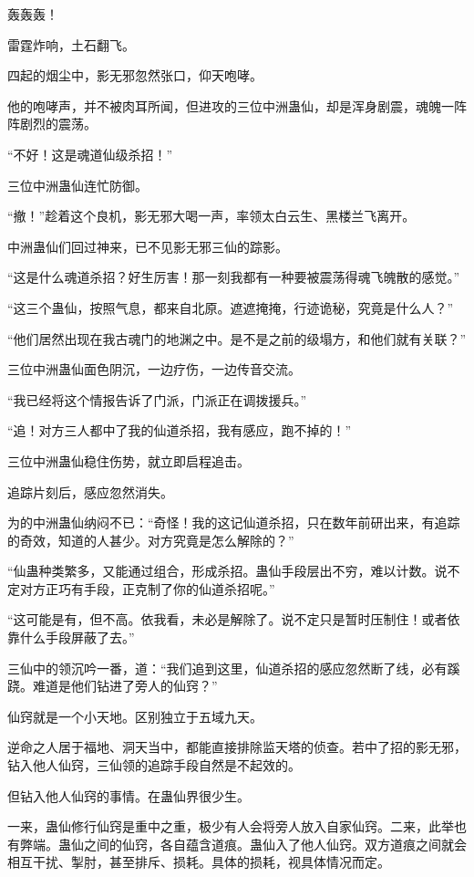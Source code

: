 
\begin{this_body}

轰轰轰！

雷霆炸响，土石翻飞。

四起的烟尘中，影无邪忽然张口，仰天咆哮。

他的咆哮声，并不被肉耳所闻，但进攻的三位中洲蛊仙，却是浑身剧震，魂魄一阵阵剧烈的震荡。

“不好！这是魂道仙级杀招！”

三位中洲蛊仙连忙防御。

“撤！”趁着这个良机，影无邪大喝一声，率领太白云生、黑楼兰飞离开。

中洲蛊仙们回过神来，已不见影无邪三仙的踪影。

“这是什么魂道杀招？好生厉害！那一刻我都有一种要被震荡得魂飞魄散的感觉。”

“这三个蛊仙，按照气息，都来自北原。遮遮掩掩，行迹诡秘，究竟是什么人？”

“他们居然出现在我古魂门的地渊之中。是不是之前的级塌方，和他们就有关联？”

三位中洲蛊仙面色阴沉，一边疗伤，一边传音交流。

“我已经将这个情报告诉了门派，门派正在调拨援兵。”

“追！对方三人都中了我的仙道杀招，我有感应，跑不掉的！”

三位中洲蛊仙稳住伤势，就立即启程追击。

追踪片刻后，感应忽然消失。

为的中洲蛊仙纳闷不已：“奇怪！我的这记仙道杀招，只在数年前研出来，有追踪的奇效，知道的人甚少。对方究竟是怎么解除的？”

“仙蛊种类繁多，又能通过组合，形成杀招。蛊仙手段层出不穷，难以计数。说不定对方正巧有手段，正克制了你的仙道杀招呢。”

“这可能是有，但不高。依我看，未必是解除了。说不定只是暂时压制住！或者依靠什么手段屏蔽了去。”

三仙中的领沉吟一番，道：“我们追到这里，仙道杀招的感应忽然断了线，必有蹊跷。难道是他们钻进了旁人的仙窍？”

仙窍就是一个小天地。区别独立于五域九天。

逆命之人居于福地、洞天当中，都能直接排除监天塔的侦查。若中了招的影无邪，钻入他人仙窍，三仙领的追踪手段自然是不起效的。

但钻入他人仙窍的事情。在蛊仙界很少生。

一来，蛊仙修行仙窍是重中之重，极少有人会将旁人放入自家仙窍。二来，此举也有弊端。蛊仙之间的仙窍，各自蕴含道痕。蛊仙入了他人仙窍。双方道痕之间就会相互干扰、掣肘，甚至排斥、损耗。具体的损耗，视具体情况而定。


\end{this_body}
